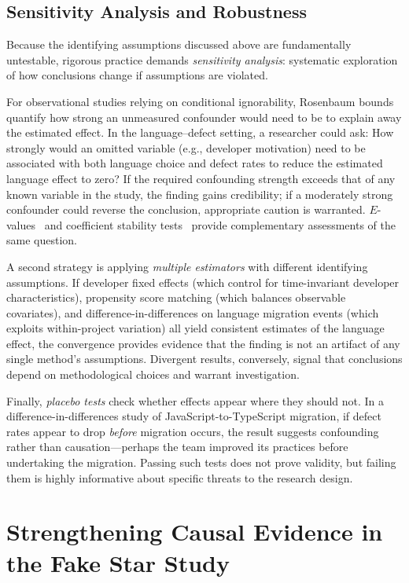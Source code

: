 \subsection{Sensitivity Analysis and Robustness}

Because the identifying assumptions discussed above are fundamentally untestable, rigorous practice demands \emph{sensitivity analysis}: systematic exploration of how conclusions change if assumptions are violated.

For observational studies relying on conditional ignorability, Rosenbaum bounds~\cite{rosenbaum2002observational} quantify how strong an unmeasured confounder would need to be to explain away the estimated effect.
In the language--defect setting, a researcher could ask: How strongly would an omitted variable (e.g., developer motivation) need to be associated with both language choice and defect rates to reduce the estimated language effect to zero?
If the required confounding strength exceeds that of any known variable in the study, the finding gains credibility; if a moderately strong confounder could reverse the conclusion, appropriate caution is warranted.
$E$-values~\cite{vanderweele2017sensitivity} and coefficient stability tests~\cite{oster2019unobservable} provide complementary assessments of the same question.

A second strategy is applying \emph{multiple estimators} with different identifying assumptions.
If developer fixed effects (which control for time-invariant developer characteristics), propensity score matching (which balances observable covariates), and difference-in-differences on language migration events (which exploits within-project variation) all yield consistent estimates of the language effect, the convergence provides evidence that the finding is not an artifact of any single method's assumptions.
Divergent results, conversely, signal that conclusions depend on methodological choices and warrant investigation.

Finally, \emph{placebo tests} check whether effects appear where they should not.
In a difference-in-differences study of JavaScript-to-TypeScript migration, if defect rates appear to drop \emph{before} migration occurs, the result suggests confounding rather than causation---perhaps the team improved its practices before undertaking the migration.
Passing such tests does not prove validity, but failing them is highly informative about specific threats to the research design.

\section{Strengthening Causal Evidence in the Fake Star Study}
\label{sec:proposed-gmm}

